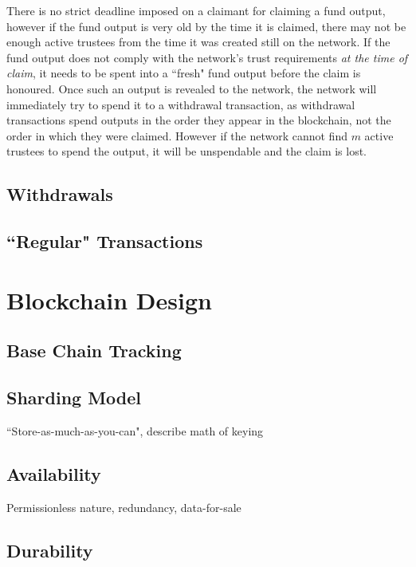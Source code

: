 \documentclass{article}
\begin{document}
			There is no strict deadline imposed on a claimant for claiming a fund output, however if the fund output is very old by the time it is claimed, there may not be enough active trustees from the time it was created still on the network. If the fund output does not comply with the network's trust requirements \textit{at the time of claim}, it needs to be spent into a ``fresh" fund output before the claim is honoured. Once such an output is revealed to the network, the network will immediately try to spend it to a withdrawal transaction, as withdrawal transactions spend outputs in the order they appear in the blockchain, not the order in which they were claimed. However if the network cannot find $m$ active trustees to spend the output, it will be unspendable and the claim is lost.

			

\subsection{Withdrawals}

\subsection{``Regular" Transactions}

\section{Blockchain Design}

\subsection{Base Chain Tracking}

\subsection{Sharding Model}

``Store-as-much-as-you-can", describe math of keying

\subsection{Availability}

Permissionless nature, redundancy, data-for-sale

\subsection{Durability}
\end{document}
